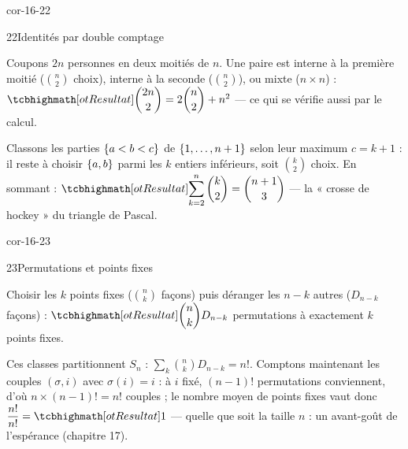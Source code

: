 \begin{blocLivre}{cor-16-22}
\begin{corrige}{22}{Identités par double comptage}
\begin{questions}
  \item Coupons $2n$ personnes en deux moitiés de $n$. Une paire est
    interne à la première moitié ($\binom n2$ choix), interne à la
    seconde ($\binom n2$), ou mixte ($n\times n$) :
    $\res{\dbinom{2n}2=2\dbinom n2+n^{2}}$ — ce qui se vérifie aussi par
    le calcul.
  \item Classons les parties $\left\{a<b<c\right\}$ de $\left\{1,\dots,n+1\right\}$ selon
    leur maximum $c=k+1$ : il reste à choisir $\left\{a,b\right\}$ parmi les $k$
    entiers inférieurs, soit $\binom k2$ choix. En sommant :
    $\res{\displaystyle\sum_{k=2}^{n}\binom k2=\binom{n+1}{3}}$ — la
    « crosse de hockey » du triangle de Pascal.
\end{questions}
\end{corrige}
\end{blocLivre}

\begin{blocLivre}{cor-16-23}
\begin{corrige}{23}{Permutations et points fixes}
\begin{questions}
  \item Choisir les $k$ points fixes ($\binom nk$ façons) puis déranger
    les $n-k$ autres ($D_{n-k}$ façons) :
    $\res{\dbinom nk D_{n-k}}$ permutations à exactement $k$ points
    fixes.
  \item Ces classes partitionnent $S_n$ :
    $\sum_k\binom nk D_{n-k}=n!$. Comptons maintenant les couples
    $(\sigma,i)$ avec $\sigma(i)=i$ : à $i$ fixé, $(n-1)!$ permutations
    conviennent, d'où $n\times(n-1)!=n!$ couples ; le nombre moyen de
    points fixes vaut donc $\dfrac{n!}{n!}=\res{1}$ — quelle que soit la
    taille $n$ : un avant-goût de l'espérance (chapitre 17).
\end{questions}
\end{corrige}
\end{blocLivre}

